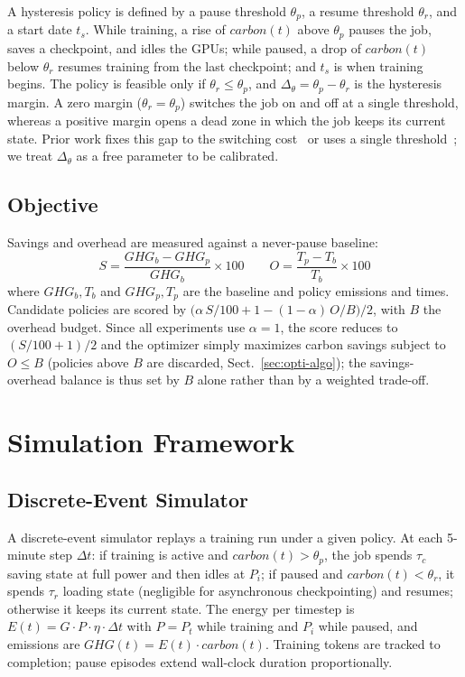 \documentclass[runningheads]{llncs}
\begin{document}
A hysteresis policy is defined by a pause threshold $\theta_p$, a
resume threshold $\theta_r$, and a start date $t_s$. While training,
a rise of $carbon(t)$ above $\theta_p$ pauses the job, saves a
checkpoint, and idles the GPUs; while paused, a drop of $carbon(t)$
below $\theta_r$ resumes training from the last checkpoint; and $t_s$
is when training begins. The policy is feasible only if $\theta_r \leq
\theta_p$, and $\Delta_\theta = \theta_p - \theta_r$ is the
hysteresis margin. A zero margin ($\theta_r = \theta_p$) switches the
job on and off at a single threshold, whereas a positive margin opens
a dead zone in which the job keeps its current state. Prior work
fixes this gap to the switching cost~\cite{lechowicz_pause_2023} or
uses a single threshold~\cite{dodge_measuring_2022}; we treat
$\Delta_\theta$ as a free parameter to be calibrated.

\subsection{Objective}

Savings and overhead are measured against a never-pause baseline:
\begin{equation}
  S = \frac{GHG_{b} - GHG_{p}}{GHG_{b}} \times 100 \qquad
  O = \frac{T_p - T_b}{T_b} \times 100
\end{equation}
where $GHG_{b}, T_b$ and $GHG_{p}, T_p$ are the baseline and policy
emissions and times. Candidate policies are scored by
$\bigl(\alpha\,S/100 + 1 - (1-\alpha)\,O/B\bigr)/2$, with $B$ the
overhead budget. Since all experiments use $\alpha = 1$, the score
reduces to $(S/100 + 1)/2$ and the optimizer simply maximizes carbon
savings subject to $O \leq B$ (policies above $B$ are discarded,
Sect.~\ref{sec:opti-algo}); the savings-overhead balance is thus set
by $B$ alone rather than by a weighted trade-off.

\section{Simulation Framework} \label{sec:simulation}

\subsection{Discrete-Event Simulator}

A discrete-event simulator replays a training run under a given
policy. At each 5-minute step $\Delta t$: if training is active and
$carbon(t) > \theta_p$, the job spends $\tau_c$ saving state at full
power and then idles at $P_i$; if paused and $carbon(t) < \theta_r$,
it spends $\tau_r$ loading state (negligible for asynchronous
checkpointing) and resumes; otherwise it keeps its current state. The
energy per timestep is $E(t) = G \cdot P \cdot \eta \cdot \Delta t$
with $P = P_t$ while training and $P_i$ while paused, and emissions
are $GHG(t) = E(t) \cdot carbon(t)$. Training tokens are tracked to
completion; pause episodes extend wall-clock duration proportionally.
\end{document}
